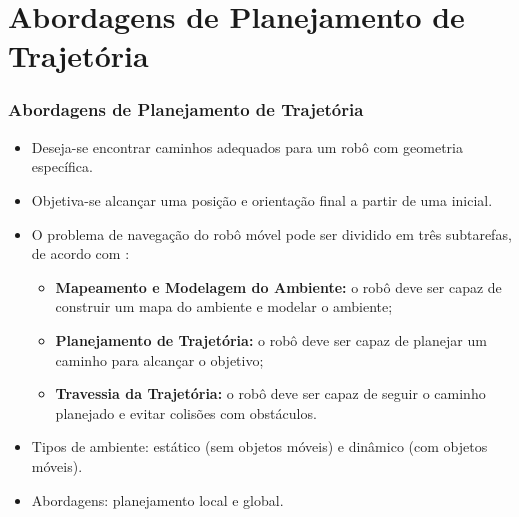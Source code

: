 \documentclass[xcolor=dvipsnames, aspectratio=169]{beamer}
\begin{document}
\section{Abordagens de Planejamento de Trajetória}
\begin{frame}[fragile]
  \frametitle{Abordagens de Planejamento de Trajetória}
  \begin{itemize}
    \item Deseja-se encontrar caminhos adequados para um robô com geometria específica.
    \item Objetiva-se alcançar uma posição e orientação final a partir de uma inicial.
    \item O problema de navegação do robô móvel pode ser dividido em três subtarefas, de acordo com \cite{buniyamin2011simple}: 
    \begin{itemize}
      \item \textbf{Mapeamento e Modelagem do Ambiente:} o robô deve ser capaz de construir um mapa do ambiente e modelar o ambiente;
      \item \textbf{Planejamento de Trajetória:} o robô deve ser capaz de planejar um caminho para alcançar o objetivo;
      \item \textbf{Travessia da Trajetória:} o robô deve ser capaz de seguir o caminho planejado e evitar colisões com obstáculos.
    \end{itemize}
    \item Tipos de ambiente: estático (sem objetos móveis) e dinâmico (com objetos móveis).
    \item Abordagens: planejamento local e global.
  \end{itemize}
  
\end{frame}
\end{document}
